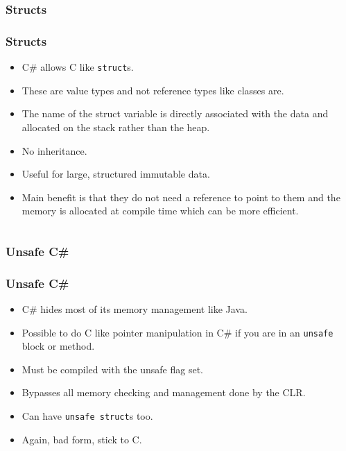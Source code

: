 \documentclass{beamer}
\begin{document}
\subsubsection{Structs}
\begin{frame}
\frametitle{Structs}
\begin{itemize}
\item C\# allows C like \texttt{struct}s.
\item These are {\color{green} value} types and not {\color{red} reference} types like classes are.
\item The name of the struct variable is directly associated with the data and allocated on the {\color{red} stack} rather than the heap.
\item No inheritance.
\item Useful for large, structured {\color{purple} immutable} data.
\item Main benefit is that they do not need a reference to point to them and the memory is allocated at compile time which can be more efficient.
\end{itemize}
\begin{columns}[t]
\sto
{}
\clas
\end{columns}
\after
\end{frame}
\subsubsection{Unsafe C\#}
\begin{frame}
\frametitle{Unsafe C\#}
\begin{itemize}
\item C\# hides most of its memory management like Java.
\item Possible to do C like {\color{red}pointer manipulation} in C\# if you are in an \texttt{unsafe} block or method.
\item Must be compiled with the unsafe flag set.
\item Bypasses all memory checking and management done by the CLR.
\item Can have \texttt{unsafe struct}s too.
\item Again, bad form, stick to C.
\end{itemize}
\end{frame}
\end{document}
